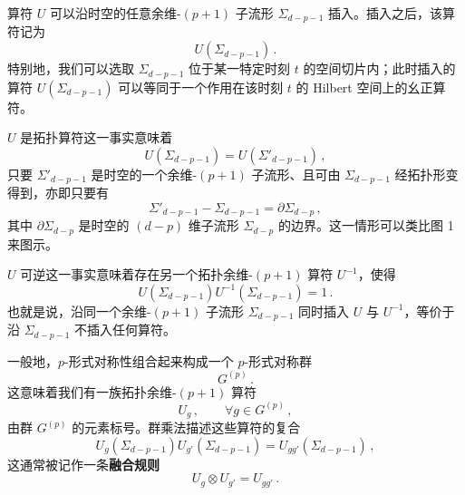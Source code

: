 
 算符 $U$ 可以沿时空的任意余维-$(p+1)$ 子流形 $\Sigma_{d-p-1}$ 插入。插入之后，该算符记为
\begin{equation}
  U(\Sigma_{d-p-1})\,. \tag{2.38}
\end{equation}
特别地，我们可以选取 $\Sigma_{d-p-1}$ 位于某一特定时刻 $t$ 的空间切片内；此时插入的算符 $U(\Sigma_{d-p-1})$ 可以等同于一个作用在该时刻 $t$ 的 Hilbert 空间上的幺正算符。


 $U$ 是拓扑算符这一事实意味着
\begin{equation}
  U(\Sigma_{d-p-1}) = U(\Sigma'_{d-p-1})\,, \tag{2.39}
\end{equation}
只要 $\Sigma'_{d-p-1}$ 是时空的一个余维-$(p+1)$ 子流形、且可由 $\Sigma_{d-p-1}$ 经拓扑形变得到，亦即只要有
\begin{equation}
  \Sigma'_{d-p-1} - \Sigma_{d-p-1} = \partial\Sigma_{d-p}\,, \tag{2.40}
\end{equation}
其中 $\partial\Sigma_{d-p}$ 是时空的 $(d-p)$ 维子流形 $\Sigma_{d-p}$ 的边界。这一情形可以类比图 1 来图示。

 $U$ 可逆这一事实意味着存在另一个拓扑余维-$(p+1)$ 算符 $U^{-1}$，使得
\begin{equation}
  U(\Sigma_{d-p-1})U^{-1}(\Sigma_{d-p-1}) = 1\,. \tag{2.41}
\end{equation}
也就是说，沿同一个余维-$(p+1)$ 子流形 $\Sigma_{d-p-1}$ 同时插入 $U$ 与 $U^{-1}$，等价于沿 $\Sigma_{d-p-1}$ 不插入任何算符。

 一般地，$p$-形式对称性组合起来构成一个 $p$-形式对称群
\begin{equation}
  G^{(p)}\,. \tag{2.42}
\end{equation}
这意味着我们有一族拓扑余维-$(p+1)$ 算符
\begin{equation}
  U_g\,, \qquad \forall g\in G^{(p)}\,, \tag{2.43}
\end{equation}
由群 $G^{(p)}$ 的元素标号。群乘法描述这些算符的复合
\begin{equation}
  U_g(\Sigma_{d-p-1})U_{g'}(\Sigma_{d-p-1}) = U_{gg'}(\Sigma_{d-p-1})\,, \tag{2.44}
\end{equation}
这通常被记作一条\textbf{融合规则}
\begin{equation}
  U_g\otimes U_{g'} = U_{gg'}\,. \tag{2.45}
\end{equation}

